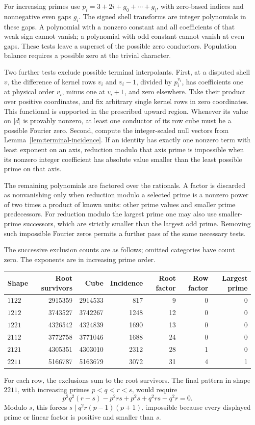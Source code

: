 \documentclass[11pt]{article}
\numberwithin{equation}{section}
\theoremstyle{definition}
\theoremstyle{remark}
\begin{document}
For increasing primes use
\(p_i=3+2i+g_0+\cdots+g_i\), with zero-based indices and
nonnegative even gaps \(g_i\). The signed shell transforms are integer
polynomials in these gaps. A polynomial with a nonzero constant and all
coefficients of that weak sign cannot vanish; a polynomial with odd
constant cannot vanish at even gaps. These tests leave a superset of
the possible zero conductors. Population balance requires a possible
zero at the trivial character.

Two further tests exclude possible terminal interpolants. First, at a
disputed shell \(v\), the difference of kernel rows \(v_i\) and
\(v_i-1\), divided by \(p_i^{v_i}\), has coefficients one at
physical order \(v_i\), minus one at \(v_i+1\), and zero elsewhere.
Take their product over positive coordinates, and fix arbitrary single
kernel rows in zero coordinates. This functional is supported in the
prescribed upward region. Whenever its value on \(|d|\) is provably
nonzero, at least one conductor of its row cube must be a possible
Fourier zero. Second, compute the integer-scaled null vectors from
Lemma~\ref{lem:terminal-incidence}. If an identity has exactly one
nonzero term with least exponent on an axis, reduction modulo that
axis prime is impossible when its nonzero integer coefficient has
absolute value smaller than the least possible prime on that axis.

The remaining polynomials are factored over the rationals. A factor is
discarded as nonvanishing only when reduction modulo a selected prime
is a nonzero power of two times a product of known units: other prime
values and smaller prime predecessors. For reduction modulo the largest
prime one may also use smaller-prime successors, which are strictly
smaller than the largest odd prime. Removing such impossible Fourier
zeros permits a further pass of the same necessary tests.

The successive exclusion counts are as follows; omitted categories have
count zero. The exponents are in increasing prime order.
\begin{center}
\small
\begin{tabular}{lrrrrrr}
\hline
Shape & Root survivors & Cube & Incidence & Root factor & Row factor & Largest prime\\
\hline
\(1122\)&2915359&2914533&817&9&0&0\\
\(1212\)&3743527&3742267&1248&12&0&0\\
\(1221\)&4326542&4324839&1690&13&0&0\\
\(2112\)&3772758&3771046&1688&24&0&0\\
\(2121\)&4305351&4303010&2312&28&1&0\\
\(2211\)&5166787&5163679&3072&31&4&1\\
\hline
\end{tabular}
\end{center}
For each row, the exclusions sum to the root survivors. The final
pattern in shape \(2211\), with increasing primes \(p<q<r<s\),
would require
\[
p^2q^2(r-s)-p^2rs+p^2s+q^2rs-q^2r=0.
\]
Modulo \(s\), this forces
\(s\mid q^2r(p-1)(p+1)\), impossible because every displayed
prime or linear factor is positive and smaller than \(s\).
\end{document}
